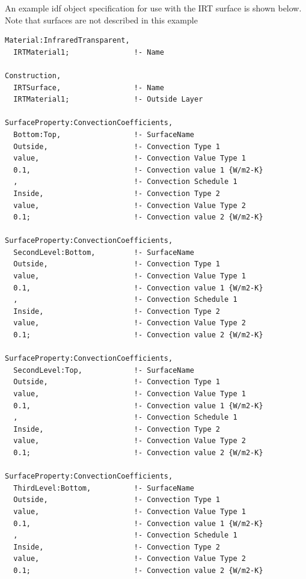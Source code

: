 An example idf object specification for use with the IRT surface is shown below. Note that surfaces are not described in this example

\begin{lstlisting}
Material:InfraredTransparent,
  IRTMaterial1;               !- Name

Construction,
  IRTSurface,                 !- Name
  IRTMaterial1;               !- Outside Layer

SurfaceProperty:ConvectionCoefficients,
  Bottom:Top,                 !- SurfaceName
  Outside,                    !- Convection Type 1
  value,                      !- Convection Value Type 1
  0.1,                        !- Convection value 1 {W/m2-K}
  ,                           !- Convection Schedule 1
  Inside,                     !- Convection Type 2
  value,                      !- Convection Value Type 2
  0.1;                        !- Convection value 2 {W/m2-K}

SurfaceProperty:ConvectionCoefficients,
  SecondLevel:Bottom,         !- SurfaceName
  Outside,                    !- Convection Type 1
  value,                      !- Convection Value Type 1
  0.1,                        !- Convection value 1 {W/m2-K}
  ,                           !- Convection Schedule 1
  Inside,                     !- Convection Type 2
  value,                      !- Convection Value Type 2
  0.1;                        !- Convection value 2 {W/m2-K}

SurfaceProperty:ConvectionCoefficients,
  SecondLevel:Top,            !- SurfaceName
  Outside,                    !- Convection Type 1
  value,                      !- Convection Value Type 1
  0.1,                        !- Convection value 1 {W/m2-K}
  ,                           !- Convection Schedule 1
  Inside,                     !- Convection Type 2
  value,                      !- Convection Value Type 2
  0.1;                        !- Convection value 2 {W/m2-K}

SurfaceProperty:ConvectionCoefficients,
  ThirdLevel:Bottom,          !- SurfaceName
  Outside,                    !- Convection Type 1
  value,                      !- Convection Value Type 1
  0.1,                        !- Convection value 1 {W/m2-K}
  ,                           !- Convection Schedule 1
  Inside,                     !- Convection Type 2
  value,                      !- Convection Value Type 2
  0.1;                        !- Convection value 2 {W/m2-K}
\end{lstlisting}

